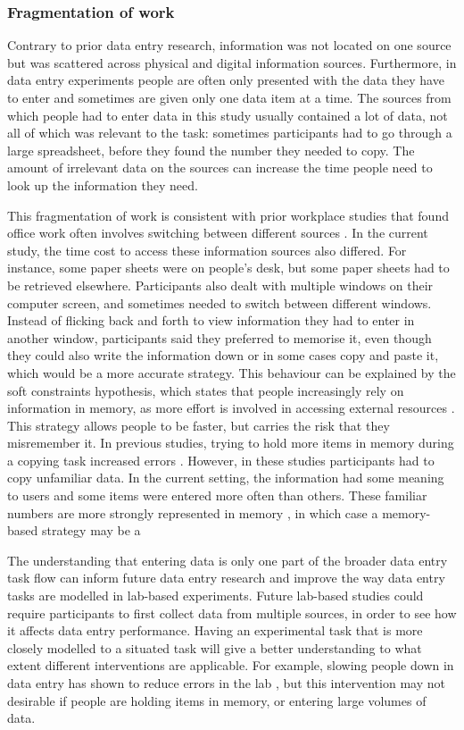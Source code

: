 \subsubsection{Fragmentation of work}
Contrary to prior data entry research, information was not located on one source but was scattered across physical and digital information sources. Furthermore, in data entry experiments people are often only presented with the data they have to enter and sometimes are given only one data item at a time. The sources from which people had to enter data in this study usually contained a lot of data, not all of which was relevant to the task: sometimes participants had to go through a large spreadsheet, before they found the number they needed to copy. The amount of irrelevant data on the sources can increase the time people need to look up the information they need. 

This fragmentation of work is consistent with prior workplace studies that found  office work often involves switching between different sources \citep{Cangiano2009, Czerwinski2004, Mark2005, Sellberg2014}. In the current study, the time cost to access these information sources also differed. For instance, some paper sheets were on people's desk, but some paper sheets had to be retrieved elsewhere. Participants also dealt with multiple windows on their computer screen, and sometimes needed to switch between different windows. Instead of flicking back and forth to view information they had to enter in another window, participants said they preferred to memorise it, even though they could also write the information down or in some cases copy and paste it, which would be a more accurate strategy. This behaviour can be explained by the soft constraints hypothesis, which states that people increasingly rely on information in memory, as more effort is involved in accessing external resources \citep{Gray2006}. This strategy allows people to be faster, but carries the risk that they misremember it. In previous studies, trying to hold more items in memory during a copying task increased errors \citep[e.g.][]{Borghouts2015, Morgan2009}. However, in these studies participants had to copy unfamiliar data. In the current setting, the information had some meaning to users and some items were entered more often than others. These familiar numbers are more strongly represented in memory \citep{Wiseman2014}, in which case a memory-based strategy may be a

The understanding that entering data is only one part of the broader data entry task flow can inform future data entry research and improve the way data entry tasks are modelled in lab-based experiments. Future lab-based studies could require participants to first collect data from multiple sources, in order to see how it affects data entry performance. Having an experimental task that is more closely modelled to a situated task will give a better understanding to what extent different interventions are applicable. For example, slowing people down in data entry has shown to reduce errors in the lab \citep{Gould2016, Wiseman2013b}, but this intervention may not desirable if people are holding items in memory, or entering large volumes of data.

